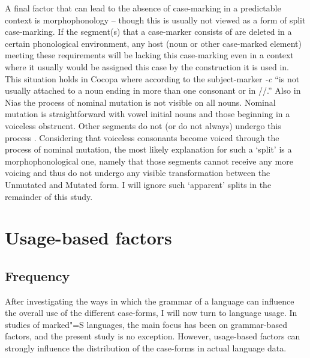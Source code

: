 A final factor that can lead to the absence of case-marking in a predictable context is morphophonology -- though this is usually not viewed as a form of split case-marking. 
If the segment(s) that a case-marker consists of are deleted in a certain phonological environment, any host (noun or other case-marked element) meeting these requirements will be lacking this case-marking even in a context where it usually would be assigned this case by the construction it is used in. 
This situation holds in Cocopa where according to \citet[104]{Crawford:1966} the subject-marker \emph{-c} ``is not usually attached to a noun ending in more than one consonant or in //.'' 
Also  in Nias the process of nominal mutation is not visible on all nouns. 
Nominal mutation is straightforward with vowel initial nouns and those beginning in a voiceless obstruent. 
Other segments do not (or do not always) undergo this process \citep[69]{Brown:2001}. 
Considering that voiceless consonants become voiced through the process of nominal mutation, the most likely explanation for such a `split' is a morphophonological one, namely that those segments cannot receive any more voicing and thus do not undergo any visible transformation between the Unmutated and Mutated form. 
I will ignore such `apparent' splits in the remainder of this study. 

 

\section{Usage-based factors}\label{usage-based}

\subsection{Frequency}

After investigating the ways in which the grammar of a language can influence the overall use of the different case-forms, I will now turn to language usage. 
In studies of marked"=S languages, the main focus has been on grammar-based factors, and the present study is no exception.
However, usage-based factors can strongly influence the distribution of the case-forms in actual language data.

